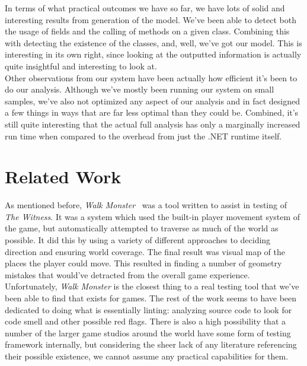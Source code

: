 \documentclass[letterpaper,twocolumn,10pt]{article}
\begin{document}
In terms of what practical outcomes we have so far, we have lots of solid and interesting results from generation of the model. We've been able to detect both the usage of fields and the calling of methods on a given class. Combining this with detecting the existence of the classes, and, well, we've got our model. This is interesting in its own right, since looking at the outputted information is actually quite insightful and interesting to look at. \\

Other observations from our system have been actually how efficient it's been to do our analysis. Although we've mostly been running our system on small samples, we've also not optimized any aspect of our analysis and in fact designed a few things in ways that are far less optimal than they could be. Combined, it's still quite interesting that the actual full analysis has only a marginally increased run time when compared to the overhead from just the .NET runtime itself. \\

\section{Related Work}

As mentioned before, \textit{Walk Monster}~\cite{WalkMonster} was a tool written to assist in testing of \textit{The Witness}. It was a system which used the built-in player movement system of the game, but automatically attempted to traverse as much of the world as possible. It did this by using a variety of different approaches to deciding direction and ensuring world coverage. The final result was visual map of the places the player could move. This resulted in finding a number of geometry mistakes that would've detracted from the overall game experience.\\

Unfortunately, \textit{Walk Monster} is the closest thing to a real testing tool that we've been able to find that exists for games. The rest of the work seems to have been dedicated to doing what is essentially linting: analyzing source code to look for code smell and other possible red flags. There is also a high possibility that a number of the larger game studios around the world have some form of testing framework internally, but considering the sheer lack of any literature referencing their possible existence, we cannot assume any practical capabilities for them.\\
\end{document}
